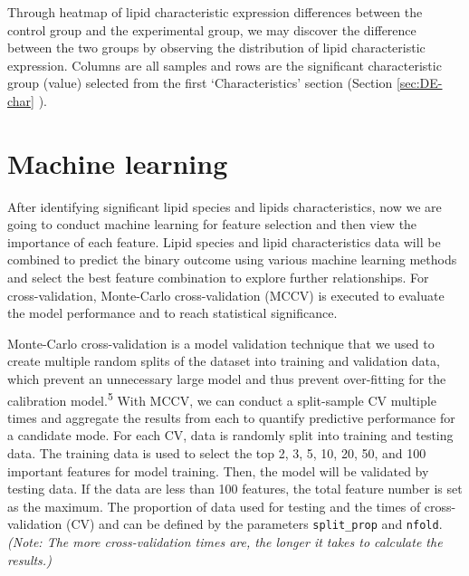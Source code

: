 \documentclass[]{article}
\newcommand{\hlcom}[1]{\textcolor[rgb]{0.502,0.502,0.502}{\textit{#1}}}%
\newcommand{\hlopt}[1]{\textcolor[rgb]{0,0,0}{#1}}%
\newcommand{\hlstd}[1]{\textcolor[rgb]{0.251,0.251,0.251}{#1}}%
\newenvironment{Shaded}{\begin{myshaded}}{\end{myshaded}}
\newcommand{\CommentTok}[1]{\hlcom{#1}}
\newcommand{\OperatorTok}[1]{\hlopt{#1}}
\newcommand{\NormalTok}[1]{\hlstd{#1}}
\begin{document}
\begin{Shaded}
\end{Shaded}

Through heatmap of lipid characteristic expression differences between the control group and the experimental group, we may discover the difference between the two groups by observing the distribution of lipid characteristic expression. Columns are all samples and rows are the significant characteristic group (value) selected from the first `Characteristics' section (Section \ref{sec:DE-char} ).

\hypertarget{ML}{%
\section{Machine learning}\label{ML}}

After identifying significant lipid species and lipids characteristics, now we are going to conduct machine learning for feature selection and then view the importance of each feature. Lipid species and lipid characteristics data will be combined to predict the binary outcome using various machine learning methods and select the best feature combination to explore further relationships. For cross-validation, Monte-Carlo cross-validation (MCCV) is executed to evaluate the model performance and to reach statistical significance.

Monte-Carlo cross-validation is a model validation technique that we used to create multiple random splits of the dataset into training and validation data, which prevent an unnecessary large model and thus prevent over-fitting for the calibration model.\textsuperscript{5} With MCCV, we can conduct a split-sample CV multiple times and aggregate the results from each to quantify predictive performance for a candidate mode. For each CV, data is randomly split into training and testing data. The training data is used to select the top 2, 3, 5, 10, 20, 50, and 100 important features for model training. Then, the model will be validated by testing data. If the data are less than 100 features, the total feature number is set as the maximum. The proportion of data used for testing and the times of cross-validation (CV) and can be defined by the parameters \texttt{split\_prop} and \texttt{nfold}. \emph{(Note: The more cross-validation times are, the longer it takes to calculate the results.)}
\end{document}
